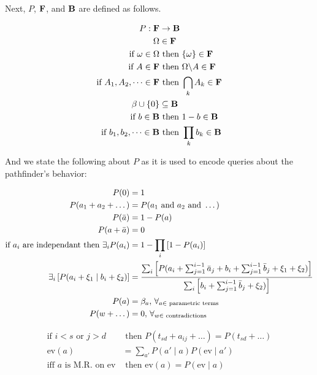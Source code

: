 \documentclass{article}
\begin{document}
Next, $P$, ${\bf F}$, and ${\bf B}$ are defined as follows.

\begin{align}
    P: {\bf F} &\to {\bf B} \\
    \Omega &\in {\bf F} \\
    \text{if } \omega \in \Omega &\text{ then } \{ \omega \} \in {\bf F} \\
    \text{if } A \in {\bf F} &\text{ then } \Omega \backslash A \in {\bf F} \\
    \text{if } A_1, A_2, \dots \in {\bf F} &\text{ then } \bigcap_k A_k \in {\bf F}\\
    \beta \cup \left\{ 0 \right\} &\subseteq {\bf B} \\
    \text{if } b \in {\bf B} &\text{ then } 1-b \in {\bf B} \\
    \text{if } b_1, b_2, \dots \in {\bf B} &\text{ then } \prod_k b_k \in {\bf B}
\end{align}

And we state the following about $P$ as it is used to encode queries
about the pathfinder's behavior:

\begin{align}
    P(0) &= 1 \\
    P(a_1 + a_2 + \dots) &= P(a_1 \text{ and } a_2 \text{ and } \dots) \\
    P(\bar a) &= 1 - P(a) \\
    P(a + \bar a) &= 0 \\
    \text{if } a_i \text{ are independant} \text{ then } \exists_i P(a_i) &= 1 - \prod_i \left[ 1 - P(a_i) \right] \\
    \exists_{i} \left[ P(a_i + \xi_1 \mid b_i + \xi_2) \right] &= { \sum_{i} \left[ P(a_i + \sum_{j=1}^{i-1} \bar a_j + b_i + \sum_{j=1}^{i-1} \bar b_j + \xi_1 + \xi_2) \right] \over \sum_{i} \left[ b_i + \sum_{j=1}^{i-1} \bar b_j + \xi_2) \right] } \\
    P(a) &= \beta_a,\, \forall_{a \in \text{ parametric terms}} \\
    P(w+\dots) &= 0,\, \forall_{w \in \text{ contradictions}} \\
\end{align}

\begin{align}
    \text{if } i < s \text{ or } j > d& \text{ then } P(t_{sd} + a_{ij} + \dots) = P(t_{sd} + \dots) \\
    \text{ev}(a) &= \sum_{a'} P(a' \mid a) P(\text{ev} \mid a') \\
    \text{iff } a \text{ is M.R. on ev}& \text{ then } \text{ev}(a) = P(\text{ev} \mid a)
\end{align}
\end{document}
